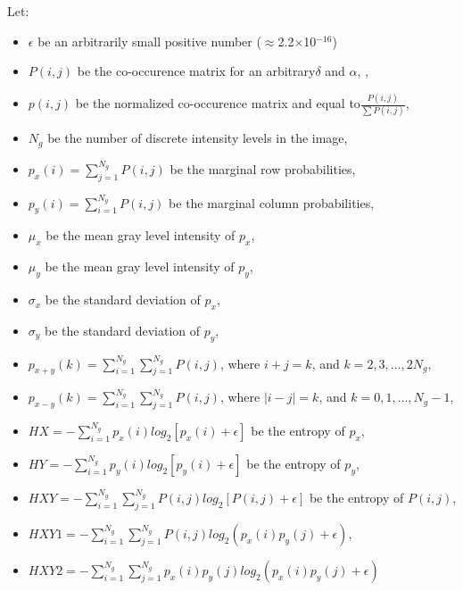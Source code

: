 Let:
\begin{itemize}
\item $\epsilon $ be an arbitrarily small positive number (${\approx}$2.2${\times}$10$^{-16}$)
\item $P\left(i,j\right)$ be the co-occurence matrix for an arbitrary$\delta $ and $\alpha $, ,
\item $p\left(i,j\right)$ be the normalized co-occurence matrix and equal to$\frac{P\left(i,j\right)}{\sum P\left(i,j\right)}$,
\item $N_{g}$ be the number of discrete intensity levels in the image,
\item $p_{x}\left(i\right)=\sum _{j=1}^{N_{g}}P\left(i,j\right)$ be the marginal row probabilities,
\item $p_{y}\left(i\right)=\sum _{i=1}^{N_{g}}P\left(i,j\right)$ be the marginal column probabilities,
\item $\mu _{x}$ be the mean gray level intensity of $p_{x}$,
\item $\mu _{y}$ be the mean gray level intensity of $p_{y}$,
\item $\sigma _{x}$ be the standard deviation of $p_{x}$,
\item $\sigma _{y}$ be the standard deviation of $p_{y}$,
\item $p_{x+y}\left(k\right)=\sum _{i=1}^{N_{g}}\sum _{j=1}^{N_{g}}P\left(i,j\right)$, where $i+j=k$, and $k=2,3,\ldots ,2N_{g}$,
\item $p_{x-y}\left(k\right)=\sum _{i=1}^{N_{g}}\sum _{j=1}^{N_{g}}P\left(i,j\right)$, where $\left| i-j\right| =k$, and $k=0,1,\ldots ,N_{g}-1$,
\item $HX=-\sum _{i=1}^{N_{g}}p_{x}\left(i\right)log_{2}\left[p_{x}\left(i\right)+\epsilon \right]$ be the entropy of $p_{x}$,
\item $HY=-\sum _{i=1}^{N_{g}}p_{y}\left(i\right)log_{2}\left[p_{y}\left(i\right)+\epsilon \right]$ be the entropy of $p_{y}$,
\item$HXY=-\sum _{i=1}^{N_{g}}\sum _{j=1}^{N_{g}}P\left(i,j\right)log_{2}\left[P\left(i,j\right)+\epsilon \right]$ be the entropy of $P\left(i,j\right)$,
\item $HXY1=-\sum _{i=1}^{N_{g}}\sum _{j=1}^{N_{g}}P\left(i,j\right)log_{2}\left(p_{x}\left(i\right)p_{y}\left(j\right)+\epsilon \right)$,
\item $HXY2=-\sum _{i=1}^{N_{g}}\sum _{j=1}^{N_{g}}p_{x}\left(i\right)p_{y}\left(j\right)log_{2}\left(p_{x}\left(i\right)p_{y}\left(j\right)+\epsilon \right)$
\end{itemize}
